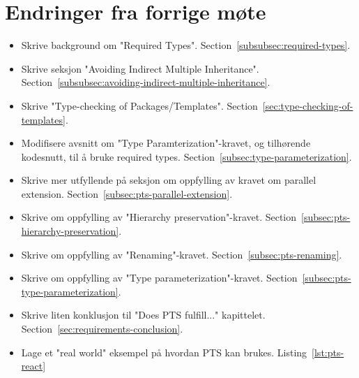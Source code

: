 
\chapter*{Endringer fra forrige møte}

\begin{itemize}
    \item Skrive background om "Required Types".
    Section~\vref{subsubsec:required-types}.
    \item Skrive seksjon "Avoiding Indirect Multiple Inheritance".
    Section~\vref{subsubsec:avoiding-indirect-multiple-inheritance}.
    \item Skrive "Type-checking of Packages/Templates".
    Section~\vref{sec:type-checking-of-templates}.
    \item Modifisere avsnitt om "Type Paramterization"-kravet, og tilhørende kodesnutt, til å bruke required types.
    Section~\vref{subsec:type-parameterization}.
    \item Skrive mer utfyllende på seksjon om oppfylling av kravet om parallel extension.
    Section~\vref{subsec:pts-parallel-extension}.
    \item Skrive om oppfylling av "Hierarchy preservation"-kravet.
    Section~\vref{subsec:pts-hierarchy-preservation}.
    \item Skrive om oppfylling av "Renaming"-kravet.
    Section~\vref{subsec:pts-renaming}.
    \item Skrive om oppfylling av "Type parameterization"-kravet.
    Section~\vref{subsec:pts-type-parameterization}.
    \item Skrive liten konklusjon til "Does PTS fulfill..." kapittelet.
    Section~\vref{sec:requirements-conclusion}.
    \item Lage et "real world" eksempel på hvordan PTS kan brukes.
    Listing~\vref{lst:pts-react}
\end{itemize}

